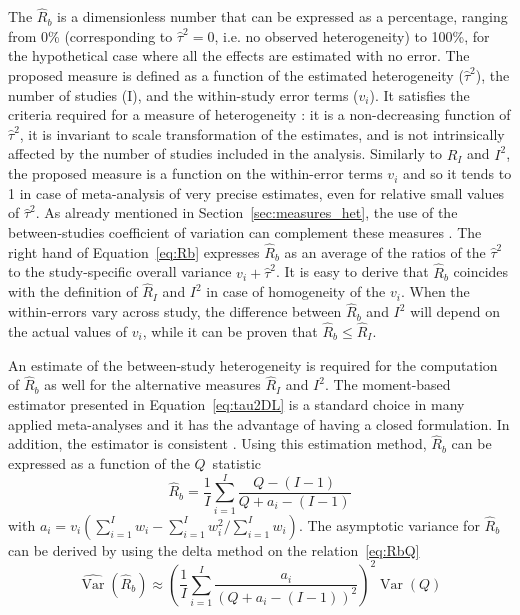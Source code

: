 \documentclass[11pt,a4paper,twoside,openany]{book}\usepackage{knitr}
\DeclareMathOperator{\Var}{Var}
\begin{document}
{{\noindent The $\hat R_b$ is a dimensionless number that can be expressed as a percentage, ranging from 0\% (corresponding to $\hat \tau^2 = 0$, i.e. no observed heterogeneity) to 100\%, for the hypothetical case where all the effects are estimated with no error. The proposed measure is defined as a function of the estimated heterogeneity ($\hat \tau^2$), the number of studies (I), and the within-study error terms ($v_i$). It satisfies the criteria required for a measure of heterogeneity \citep{higgins2002quantifying}: it is a non-decreasing function of $\hat \tau^2$, it is invariant to scale transformation of the estimates, and is not intrinsically affected by the number of studies included in the analysis. Similarly to $\hat R_I$ and $I^2$, the proposed measure is a function on the within-error terms $v_i$ and so it tends to 1 in case of meta-analysis of very precise estimates, even for relative small values of $\hat \tau^2$. As already mentioned in Section~\ref{sec:measures_het}, the use of the between-studies coefficient of variation can complement these measures \citep{takkouche1999evaluation}.
The right hand of Equation~\ref{eq:Rb} expresses $\hat R_b$ as an average of the ratios of the $\hat \tau^2$ to the study-specific overall variance $v_i + \hat \tau^2$. It is easy to derive that $\hat R_b$ coincides with the definition of $\hat R_I$ and $I^2$ in case of homogeneity of the $v_i$. When the within-errors vary across study, the difference between $\hat R_b$ and $I^2$ will depend on the actual values of $v_i$, while it can be proven that $\hat R_b \le \hat R_I$.

An estimate of the between-study heterogeneity is required for the computation of $\hat R_b$ as well for the alternative measures $\hat R_I$ and $I^2$. The moment-based estimator presented in Equation~\ref{eq:tau2DL} is a standard choice in many applied meta-analyses and it has the advantage of having a closed formulation. In addition, the estimator is consistent \citep{jackson2010extending}. Using this estimation method, $\hat R_b$ can be expressed as a function of the $Q$~statistic
\begin{equation}
\hat R_b = \frac{1}{I} \sum_{i = 1}^I \frac{Q - (I-1)}{Q + a_i - (I - 1)} 
\label{eq:RbQ}
\end{equation}
\noindent with $a_i = v_i \left(\sum_{i = 1}^I w_i - \sum_{i = 1}^Iw_i^2/\sum_{i = 1}^I w_i \right)$. The asymptotic variance for $\hat R_b$ can be derived by using the delta method on the relation~\ref{eq:RbQ}
\begin{equation}
\widehat{\Var} \left(\hat R_b \right) \approx \left(  \frac{1}{I} \sum_{i = 1}^I \frac{a_i}{(Q + a_i - (I-1))^2} \right)^2 \Var(Q)
\label{eq:var_Rb}
\end{equation}

}}
\end{document}
